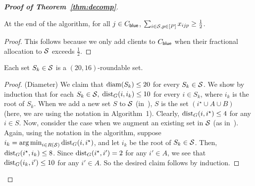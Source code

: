 \begin{proof}[{\bf Proof of Theorem~\ref{thm:decomp}}]
\begin{claim}
	At the end of the algorithm, for all $j \in C_{\mathsf{blue}}$, $\sum_{i \in {\cal S}, p \in [P]} x_{ijp} \geq \frac12$.	
\end{claim}
\begin{proof}
This follows because we only add clients to $C_{\mathsf{blue}}$ when their fractional allocation to ${\cal S}$ exceeds $\frac12$.
\end{proof}



\begin{lemma}
Each set $S_k \in {\cal S}$ is a $(20,16)$-roundable set.
\end{lemma}
\begin{proof}
(Diameter) We claim that $\mathrm{diam}(S_k) \leq 20$ for every $S_k \in {\cal S}$. We show by induction that for each $S_k \in {\cal S},$
$\mathrm{dist}_G(i,i_k) \leq 10$ for every $i \in S_k$, where $i_k$ is the root of $S_k$. When we add a new set $S$ to ${\cal S}$ (in~),
$S$ is the set $(i^\star \cup A \cup B)$ (here, we are using the notation in Algorithm~1). Clearly, $\mathrm{dist}_G(i, i^\star) \leq 4$
for any $i \in S$. Now, consider the case when we augment an existing set  in $\cal S$ (as in~).
Again, using the notation in the algorithm, suppose $i_k = \operatorname*{arg\,min}_{i \in R({\cal S})} \mathrm{dist}_G(i, i^\star)$, and let $i_k$ be the
root of $S_k \in {\cal S}$. Then, $\mathrm{dist}_G(i^\star, i_k) \leq 8$. Since $\mathrm{dist}_G(i^\star, i') = 2$ for any $i' \in A$, we see that
$\mathrm{dist}_G(i_k, i') \leq 10$ for any $i' \in A$.
So the desired claim follows by induction.
\smallskip


\end{proof}
\end{proof}
